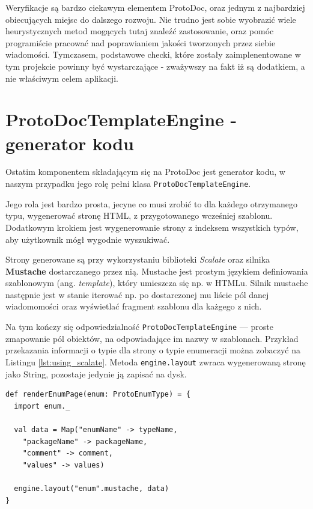 \documentclass[pdflatex,11pt]{aghdpl}
\begin{document}
Weryfikacje są bardzo ciekawym elementem ProtoDoc, oraz jednym z najbardziej obiecujących miejsc do dalszego rozwoju.
Nie trudno jest sobie wyobrazić wiele heurystycznych metod mogących tutaj znaleźć zastosowanie, oraz pomóc programiście
pracować nad poprawianiem jakości tworzonych przez siebie wiadomości. Tymczasem, podstawowe checki, które zostały
zaimplenentowane w tym projekcie powinny być wystarczające - zważywszy na fakt iż są dodatkiem, a nie właściwym celem aplikacji.

\section{ProtoDocTemplateEngine - generator kodu}
Ostatim komponentem składającym się na ProtoDoc jest generator kodu, w naszym przypadku jego rolę pełni klasa \verb|ProtoDocTemplateEngine|.

Jego rola jest bardzo prosta, jecyne co musi zrobić to dla każdego otrzymanego typu, wygenerować stronę HTML, z przygotowanego wcześniej szablonu.
Dodatkowym krokiem jest wygenerowanie strony z indeksem wszystkich typów, aby użytkownik mógł wygodnie wyszukiwać.

Strony generowane są przy wykorzystaniu biblioteki \textit{Scalate} \cite{Scalate}
oraz silnika \textbf{Mustache} dostarczanego przez nią. Mustache jest prostym językiem definiowania szablonowym (ang. \textit{template}), który umieszcza 
się np. w HTMLu. Silnik mustache następnie jest w stanie iterować np. po dostarczonej mu liście pól danej wiadomomości oraz wyświetlać fragment szablonu dla każgego z nich.

Na tym kończy się odpowiedzialność \verb|ProtoDocTemplateEngine| --- proste zmapowanie pól obiektów, na odpowiadające im nazwy w szablonach.
Przykład przekazania informacji o typie dla strony o typie enumeracji można zobaczyć na Listingu \ref{lst:using_scalate}. Metoda \verb|engine.layout|
zwraca wygenerowaną stronę jako String, pozostaje jedynie ją zapisać na dysk.

\newpage
\begin{lstlisting}[caption={Przykład zastosowania Scalate (z silnikiem renderowania szablonów Mustache)}label={lst:using_scalate}]
def renderEnumPage(enum: ProtoEnumType) = {
  import enum._

  val data = Map("enumName" -> typeName,
    "packageName" -> packageName,
    "comment" -> comment,
    "values" -> values)

  engine.layout("enum".mustache, data)
}
\end{lstlisting}
\end{document}
